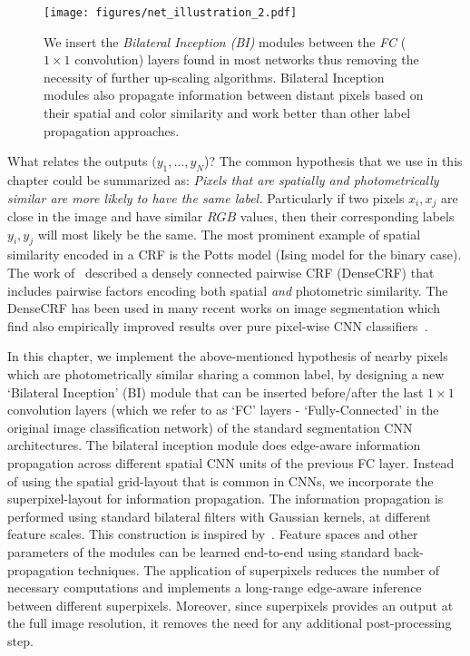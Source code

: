 \begin{figure}[t]
\begin{center}
\centerline{\texttt{[image: figures/net\_illustration\_2.pdf]}}
   {We insert the \emph{Bilateral Inception (BI)} modules
  between the \emph{FC} ($1\times1$ convolution) layers found in
  most networks thus removing the necessity
  of further up-scaling algorithms. Bilateral Inception modules also propagate information
  between distant pixels based on their spatial and color similarity and work
  better than other label propagation approaches.}\label{fig:illustration}
  \vspace{-0.3cm}
\end{center}
\end{figure}

What relates the outputs $(y_1,\ldots,y_N$)? The common hypothesis that
we use in this chapter could be summarized as:
\emph{Pixels that are spatially and photometrically similar are more likely to have the same label.}
Particularly if two pixels $x_i,x_j$ are close in the image and have similar
$RGB$ values, then their corresponding labels $y_i,y_j$ will most likely be the same.
The most prominent example of spatial similarity encoded in a CRF is the Potts model (Ising model for
the binary case).
The work of~\cite{krahenbuhl2012efficient} described a densely connected pairwise CRF (DenseCRF) that includes
pairwise factors encoding both spatial \emph{and} photometric similarity.
The DenseCRF has been used in many recent works on image segmentation
which find also empirically improved results over pure pixel-wise CNN
classifiers~\cite{chen2014semantic,bell2015minc,zheng2015conditional,chen2015semantic}.

In this chapter, we implement the above-mentioned hypothesis of nearby pixels which are photometrically
similar sharing a common label, by designing a new
`Bilateral Inception' (BI) module that can be inserted before/after the last $1\times1$ convolution
layers (which we refer to as `FC' layers - `Fully-Connected' in the original image classification network) of the standard segmentation CNN architectures. The bilateral inception module does edge-aware information propagation across different spatial CNN units of the previous FC layer. Instead of using the spatial grid-layout that is common in CNNs,
we incorporate the superpixel-layout for information propagation. The information
propagation is performed using standard bilateral filters with Gaussian kernels, at
different feature scales. This construction is inspired by~\cite{szegedy2014googlenet,lin2014network}. Feature spaces and other parameters of
the modules can be learned end-to-end using standard back-propagation techniques.
The application of superpixels reduces the number of necessary computations and implements a long-range edge-aware inference between different superpixels. Moreover, since superpixels
provides an output at the full image resolution, it removes the need
for any additional post-processing step.

